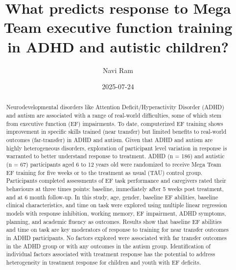 \documentclass[
  letterpaper,
]{ut-thesis}
\title{What predicts response to Mega Team executive function training
in ADHD and autistic children?}
\author{Navi Ram}
\date{2025-07-24}
\renewcommand*\contentsname{Table of contents}
\newcommand\contentsname{Table of contents}
\begin{document}
\maketitle
{}
\setcounter{page}{2}
\begin{abstract}
Neurodevelopmental disorders like Attention Deficit/Hyperactivity
Disorder (ADHD) and autism are associated with a range of real-world
difficulties, some of which stem from executive function (EF)
impairments. To date, computerized EF training shows improvement in
specific skills trained (near transfer) but limited benefits to
real-world outcomes (far-transfer) in ADHD and autism. Given that ADHD
and autism are highly heterogeneous disorders, exploration of
participant level variation in response is warranted to better
understand response to treatment. ADHD (n = 186) and autistic (n = 67)
participants aged 6 to 12 years old were randomized to receive Mega Team
EF training for five weeks or to the treatment as usual (TAU) control
group. Participants completed assessments of EF task performance and
caregivers rated their behaviours at three times points: baseline,
immediately after 5 weeks post treatment, and at 6 month follow-up. In
this study, age, gender, baseline EF abilities, baseline clinical
characteristics, and time on task were explored using multiple linear
regression models with response inhibition, working memory, EF
impairment, ADHD symptoms, planning, and academic fluency as outcomes.
Results show that baseline EF abilities and time on task are key
moderators of response to training for near transfer outcomes in ADHD
participants. No factors explored were associated with far transfer
outcomes in the ADHD group or with any outcomes in the autism group.
Identification of individual factors associated with treatment response
has the potential to address heterogeneity in treatment response for
children and youth with EF deficits.
\end{abstract}

\renewcommand*\contentsname{Table of Contents}
{
\hypersetup{linkcolor=}
\setcounter{tocdepth}{2}
\tableofcontents
}
\newpage
\listoftables
\newpage
\listoffigures
\newpage


\newcommand{\listappendicesname}{List of Appendices}
\newlistof{appendices}{apc}{\listappendicesname}
\newcommand{\appendices}[1]{\addcontentsline{apc}{appendices}{#1}}
\parindent0mm

\listofappendices
{}
\end{document}
